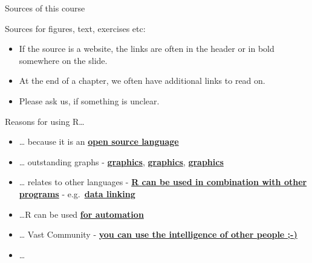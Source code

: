 \documentclass[
  10pt,
  ignorenonframetext,
]{beamer}
\providecommand{\tightlist}{%
  \setlength{\itemsep}{0pt}\setlength{\parskip}{0pt}}
\begin{document}
\begin{frame}{Sources of this course}
\protect\hypertarget{sources-of-this-course}{}

\begin{block}{Sources for figures, text, exercises etc:}

\begin{itemize}
\tightlist
\item
  If the source is a website, the links are often in the header or in
  bold somewhere on the slide.
\item
  At the end of a chapter, we often have additional links to read on.
\item
  Please ask us, if something is unclear.
\end{itemize}

\end{block}

\end{frame}

\begin{frame}{Reasons for using R\ldots{}}
\protect\hypertarget{reasons-for-using-r}{}

\begin{itemize}
\tightlist
\item
  \ldots{} because it is an
  \href{https://stackoverflow.com/questions/1546583/what-is-the-definition-of-an-open-source-programming-language}{\textbf{open
  source language}}
\item
  \ldots{} outstanding graphs -
  \href{http://matthewlincoln.net/2014/12/20/adjacency-matrix-plots-with-r-and-ggplot2.html}{\textbf{graphics}},
  \href{https://www.r-bloggers.com/3d-plots-with-ggplot2-and-plotly\%20/}{\textbf{graphics}},
  \href{https://procomun.wordpress.com/2011/03/18/splomr/}{\textbf{graphics}}
\item
  \ldots{} relates to other languages -
  \href{https://github.com/Japhilko/RInterfaces}{\textbf{R can be used
  in combination with other programs}} -
  e.g.~\href{https://github.com/Japhilko/RInterfaces/blob/master/slides/Datenimport.md}{\textbf{data
  linking}}
\item
  \ldots R can be used
  \href{https://cran.r-project.org/web/packages/MplusAutomation/index.html}{\textbf{for
  automation}}
\item
  \ldots{} Vast Community -
  \href{https://www.r-bloggers.com/}{\textbf{you can use the
  intelligence of other people ;-)}}
\item
  \ldots{}
\end{itemize}

\end{frame}
\end{document}

